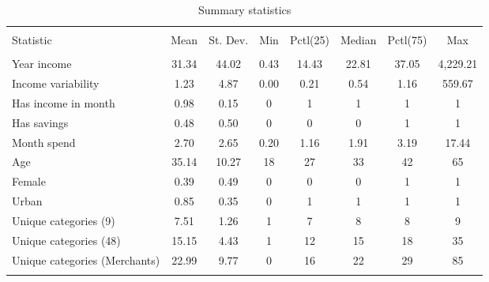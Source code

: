 
\begin{table}[H] \centering 
  \caption{Summary statistics} 
  \label{tab:sumstats} 
\footnotesize 
\begin{tabular}{@{\extracolsep{5pt}}lccccccc} 
\\[-1.8ex]\hline 
\hline \\[-1.8ex] 
Statistic & \multicolumn{1}{c}{Mean} & \multicolumn{1}{c}{St. Dev.} & \multicolumn{1}{c}{Min} & \multicolumn{1}{c}{Pctl(25)} & \multicolumn{1}{c}{Median} & \multicolumn{1}{c}{Pctl(75)} & \multicolumn{1}{c}{Max} \\ 
\hline \\[-1.8ex] 
Year income & 31.34 & 44.02 & 0.43 & 14.43 & 22.81 & 37.05 & 4,229.21 \\ 
Income variability & 1.23 & 4.87 & 0.00 & 0.21 & 0.54 & 1.16 & 559.67 \\ 
Has income in month & 0.98 & 0.15 & 0 & 1 & 1 & 1 & 1 \\ 
Has savings & 0.48 & 0.50 & 0 & 0 & 0 & 1 & 1 \\ 
Month spend & 2.70 & 2.65 & 0.20 & 1.16 & 1.91 & 3.19 & 17.44 \\ 
Age & 35.14 & 10.27 & 18 & 27 & 33 & 42 & 65 \\ 
Female & 0.39 & 0.49 & 0 & 0 & 0 & 1 & 1 \\ 
Urban & 0.85 & 0.35 & 0 & 1 & 1 & 1 & 1 \\ 
Unique categories (9) & 7.51 & 1.26 & 1 & 7 & 8 & 8 & 9 \\ 
Unique categories (48) & 15.15 & 4.43 & 1 & 12 & 15 & 18 & 35 \\ 
Unique categories (Merchants) & 22.99 & 9.77 & 0 & 16 & 22 & 29 & 85 \\ 
\hline \\[-1.8ex] 
\end{tabular} 
\end{table} 
